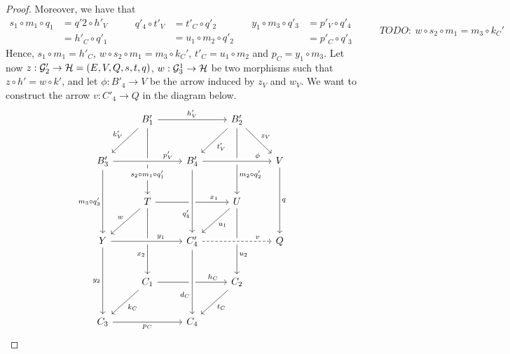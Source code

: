 \begin{proof}
	Moreover, we have that
	\[
		\begin{split}
			s_1 \circ m_1 \circ q_1 &= q'2 \circ h'_V \\ &= h'_C \circ q'_1
		\end{split}\qquad\begin{split}
			q'_4 \circ t'_V &= t'_C \circ q'_2\\ &= u_1\circ m_2 \circ q'_2
		\end{split}\quad\begin{split}
			y_1 \circ m_3 \circ q'_3 &= p'_V \circ q'_4\\ &= p'_C \circ q'_3
		\end{split}\qquad\begin{split}TODO:\ w \circ s_2 \circ m_1 = m_3 \circ k_C'
		\end{split}
	\]
	Hence, $s_1\circ m_1 = h'_C$, $w \circ s_2 \circ m_1 = m_3 \circ k_C'$, $t'_C = u_1 \circ m_2$ and $p_C = y_1 \circ m_3$.
	Let now $z: \mathcal{G}'_2 \to \mathcal{H} = (E, V, Q, s, t, q)$, $w: \mathcal{G}_3^1 \to \mathcal{H}$ be two morphisms such that $z \circ h' = w \circ k'$, and let $\phi:B'_4 \to V$ be the arrow induced by $z_V$ and $w_V$. We want to construct the arrow $v: C'_4 \to Q$ in the diagram below.
	\[\begin{tikzcd}[row sep = 25, column sep = 25]
	& {B_1'} && {B_2'} \\
	{B_3'} && {B_4'} && V \\
	& T && U \\
	Y && {C_4'} && Q \\
	& {C_1} && {C_2} \\
	{C_3} && {C_4}
	\arrow["{h_V'}", from=1-2, to=1-4]
	\arrow["{k_V'}"', from=1-2, to=2-1]
	\arrow["{s_2\circ m_1 \circ q_1'}"{description, pos=0.7}, from=1-2, to=3-2]
	\arrow["{t_V'}", from=1-4, to=2-3]
	\arrow["{z_V}", from=1-4, to=2-5]
	\arrow["{m_2\circ q'_2}"{pos=0.7}, from=1-4, to=3-4]
	\arrow["{m_3 \circ q'_3}"', from=2-1, to=4-1]
	\arrow["q", from=2-5, to=4-5]
	\arrow["{x_1}"{pos=0.8}, from=3-2, to=3-4]
	\arrow["w"', from=3-2, to=4-1]
	\arrow["{x_2}"'{pos=0.7}, from=3-2, to=5-2]
	\arrow["{u_1}", from=3-4, to=4-3]
	\arrow["{u_2}"{pos=0.7}, from=3-4, to=5-4]
	\arrow["{y_2}"', from=4-1, to=6-1]
	\arrow["{h_C}"{pos=0.8}, from=5-2, to=5-4]
	\arrow["{k_C}", from=5-2, to=6-1]
	\arrow["{t_C}", from=5-4, to=6-3]
	\arrow["{p_C}"', from=6-1, to=6-3]
	\arrow["{p_V'}"{pos=0.8}, from=2-1, to=2-3, crossing over]
	\arrow["\phi"{pos=0.8}, from=2-3, to=2-5, crossing over]
	\arrow["{q'_4}"'{pos=0.7}, from=2-3, to=4-3, crossing over]
	\arrow["{y_1}"{pos=0.7}, from=4-1, to=4-3, crossing over]
	\arrow["{d_C}"'{pos=0.7}, from=4-3, to=6-3, crossing over]
	\arrow["v"{pos=0.8}, dashed, from=4-3, to=4-5, crossing over]
	\end{tikzcd}\]
	

\end{proof}
